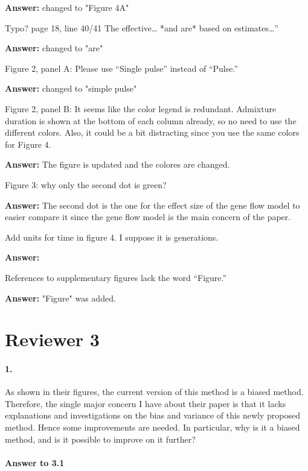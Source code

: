 \documentclass[11pt]{article}
\let\oldparagraph\paragraph
\renewcommand{\paragraph}[1]{\oldparagraph{#1}\mbox{}}
\begin{document}
\textbf{Answer:} changed to "Figure 4A"

Typo? page 18, line 40/41 The effective… *and are* based on estimates…” 

\textbf{Answer:} changed to "are"

Figure 2, panel A: Please use “Single pulse” instead of “Pulse.”

\textbf{Answer:} changed to "simple pulse"


Figure 2, panel B: It seems like the color legend is redundant. Admixture duration is shown at the bottom of each column already, so no need to use the different colors. Also, it could be a bit distracting since you use the same colors for Figure 4. 

\textbf{Answer:} The figure is updated and the colores are changed.

Figure 3: why only the second dot is green?

\textbf{Answer:} The second dot is the one for the effect size of the gene flow model to easier compare it since the gene flow model is the main concern of the paper.

Add units for time in figure 4. I suppose it is generations.

\textbf{Answer:} 

References to supplementary figures lack the word “Figure.” 

\textbf{Answer:} "Figure" was added.

\section{Reviewer 3}\label{Reviewer 3}

\paragraph{1.}
As shown in their figures, the current version of this method is a biased method. Therefore, the single major concern I have about their paper is that it lacks explanations and investigations on the bias and variance of this newly proposed method. Hence some improvements are needed. In particular, why is it a biased method, and is it possible to improve on it further?

\paragraph{Answer to 3.1}
\end{document}
